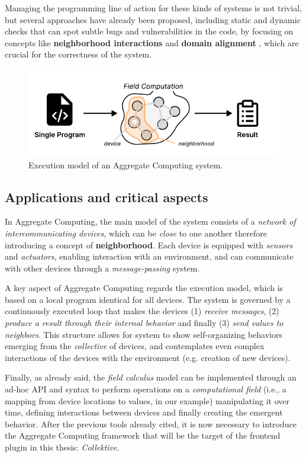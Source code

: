 \documentclass[12pt,a4paper,openright,twoside]{book}
\begin{document}
Managing the programming line of action for these kinds of systems is not
trivial, but several approaches have already been proposed, including static and
dynamic checks that can spot subtle bugs and vulnerabilities in the code, by
focusing on concepts like \textbf{neighborhood interactions} and \textbf{domain
alignment} \cite{DBLP:conf/saso/AudritoDVC16}, which are crucial for the
correctness of the system.

\begin{figure}
  \centering
  \includegraphics[width=.9\linewidth]{figures/field-computation.pdf}
  \caption{Execution model of an Aggregate Computing system.}
  \label{fig:field-computation}
\end{figure}

\subsection{Applications and critical aspects}

In Aggregate Computing, the main model of the system consists of a \emph{network of 
intercommunicating devices}, which can be \emph{close} to one another therefore 
introducing a concept of \textbf{neighborhood}. 
%
Each device is equipped with \emph{sensors} and \emph{actuators}, enabling
interaction with an environment, and can communicate with other devices through
a \emph{message-passing} system. 

A key aspect of Aggregate Computing regards the execution model, which is based
on a local program identical for all devices. The system is governed by a
continuously executed loop that makes the devices (1) \emph{receive messages},
(2) \emph{produce a result through their internal behavior} and finally (3)
\emph{send values to neighbors}. 
%
This structure allows for system to show self-organizing behaviors emerging from
the \emph{collective} of devices, and contemplates even complex interactions of
the devices with the environment (e.g. creation of new devices).

Finally, as already said, the \emph{field calculus} model can be implemented
through an ad-hoc API and syntax to perform operations on a \emph{computational
field} (i.e., a mapping from device locations to values, in our example)
manipulating it over time, defining interactions between devices and finally
creating the emergent behavior.
%
After the previous tools already cited, it is now necessary to
introduce the Aggregate Computing framework that will be the target of the
frontend plugin in this thesis: \emph{Collektive}.
\end{document}
